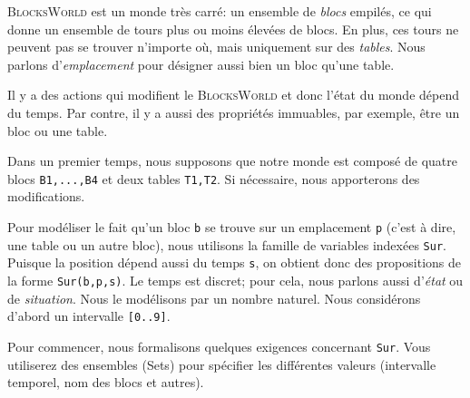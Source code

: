 \textsc{BlocksWorld} est un monde très carré: un ensemble de \emph{blocs} empilés, ce
qui donne un ensemble de tours plus ou moins élevées de blocs. En plus, ces
tours ne peuvent pas se trouver n'importe où, mais uniquement sur des
\emph{tables}. Nous parlons d'\emph{emplacement} pour désigner aussi bien un bloc qu'une table.

Il y a des actions qui modifient le \textsc{BlocksWorld} et donc l'état du monde 
dépend du temps. Par contre, il y a aussi des propriétés immuables, par exemple, être un bloc ou une table.

Dans un premier temps, nous supposons que notre monde est composé de quatre
blocs \texttt{B1,...,B4} et deux tables \texttt{T1,T2}. Si nécessaire, nous apporterons
des modifications. 

Pour modéliser le fait qu'un bloc \texttt{b} se trouve sur un emplacement \texttt{p} (c'est à
dire, une table ou un autre bloc), nous utilisons la famille de variables indexées
\texttt{Sur}. Puisque la position dépend aussi du temps \texttt{s}, on obtient donc
des propositions de la forme \texttt{Sur(b,p,s)}. Le temps est discret; pour cela,
nous parlons aussi d'\emph{état} ou de \emph{situation}. Nous le modélisons par un nombre
naturel. Nous considérons d'abord un intervalle \texttt{[0..9]}.

Pour commencer, nous formalisons quelques exigences concernant \texttt{Sur}. Vous utiliserez des ensembles (Sets) pour spécifier les différentes valeurs (intervalle temporel, nom des blocs et autres). 

